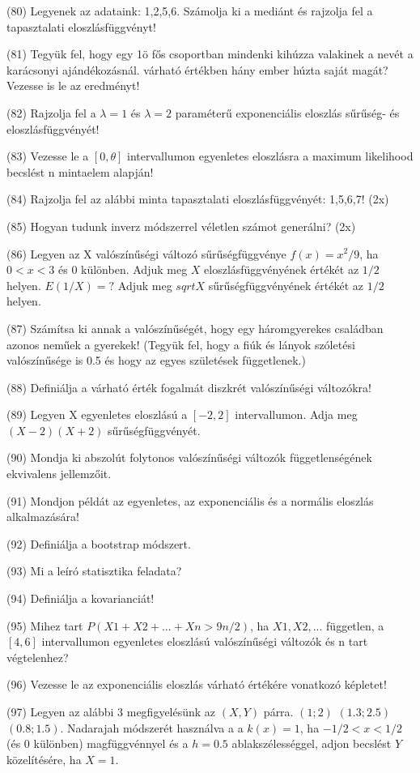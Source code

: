 \documentclass[12p]{article}
\begin{document}
(80) Legyenek az adataink: 1,2,5,6. Számolja ki a mediánt és rajzolja fel a tapasztalati eloszlásfüggvényt!

(81) Tegyük fel, hogy egy 1ö fős csoportban mindenki kihúzza valakinek a nevét a karácsonyi ajándékozásnál. várható értékben hány ember húzta saját magát? Vezesse is le az eredményt!

(82) Rajzolja fel a $\lambda = 1$ és $\lambda = 2$ paraméterű exponenciális eloszlás sűrűség- és eloszlásfüggvényét!

(83) Vezesse le a $[0, \theta]$ intervallumon egyenletes eloszlásra a maximum likelihood becslést n mintaelem alapján!

(84) Rajzolja fel az alábbi minta tapasztalati eloszlásfüggvényét: 1,5,6,7! (2x)

(85) Hogyan tudunk inverz módszerrel véletlen számot generálni? (2x)

(86) Legyen az X valószínűségi változó sűrűségfüggvénye $f(x) = x^2/9$, ha $0 < x < 3$ és $0$ különben. Adjuk meg $X$ eloszlásfüggvényének értékét az $1/2$ helyen. $E(1/X)=?$ Adjuk meg $sqrt{X}$ sűrűségfüggvényének értékét az $1/2$ helyen.

(87) Számítsa ki annak a valószínűségét, hogy egy háromgyerekes családban azonos neműek a gyerekek! (Tegyük fel, hogy a fiúk és lányok szóletési valószínűsége is 0.5 és hogy az egyes születések függetlenek.)

(88) Definiálja a várható érték fogalmát diszkrét valószínűségi változókra!

(89)  Legyen X egyenletes eloszlású a $[-2,2]$ intervallumon. Adja meg $(X - 2)(X + 2)$ sűrűségfüggvényét.

(90) Mondja ki abszolút folytonos valószínűségi változók függetlenségének ekvivalens
jellemzőit.

(91) Mondjon példát az egyenletes, az exponenciális és a normális eloszlás alkalmazására!

(92) Definiálja a bootstrap módszert.

(93) Mi a leíró statisztika feladata?

(94) Definiálja a kovarianciát!

(95) Mihez tart $P(X1+X2+ ... +Xn > 9n/2)$, ha $X1, X2, . . .$ független, a $[4,6]$ intervallumon
egyenletes eloszlású valószínűségi változók és n tart végtelenhez?

(96) Vezesse le az exponenciális eloszlás várható értékére vonatkozó képletet!

(97) Legyen az alábbi 3 megfigyelésünk az $(X, Y)$ párra. $(1;2)$ $(1.3;2.5)$ $(0.8;1.5)$. Nadarajah
módszerét használva a a $k(x) = 1$, ha $-1/2 < x < 1/2$ (és 0 különben) magfüggvénnyel és a $h = 0.5$ ablakszélességgel, adjon becslést $Y$ közelítésére, ha $X = 1$.
\end{document}
